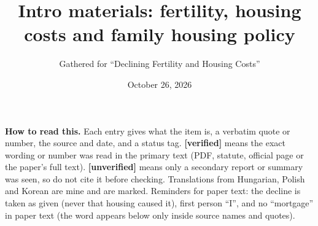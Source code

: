 \documentclass[10pt]{article}
\title{Intro materials: fertility, housing costs and family housing policy}
\author{Gathered for ``Declining Fertility and Housing Costs''}
\date{October 26, 2026}
\newcommand{\ok}{\textcolor{green!45!black}{\textbf{[verified]}}}
\newcommand{\unv}{\textcolor{red!70!black}{\textbf{[unverified]}}}
\begin{document}
\maketitle

\textbf{How to read this.} Each entry gives what the item is, a verbatim quote or number, the source and date, and a status tag.
\ok{} means the exact wording or number was read in the primary text (PDF, statute, official page or the paper's full text). \unv{} means only a secondary report or summary was seen, so do not cite it before checking.
Translations from Hungarian, Polish and Korean are mine and are marked.
Reminders for paper text: the decline is taken as given (never that housing caused it), first person ``I'', and no ``mortgage'' in paper text (the word appears below only inside source names and quotes).
\end{document}
